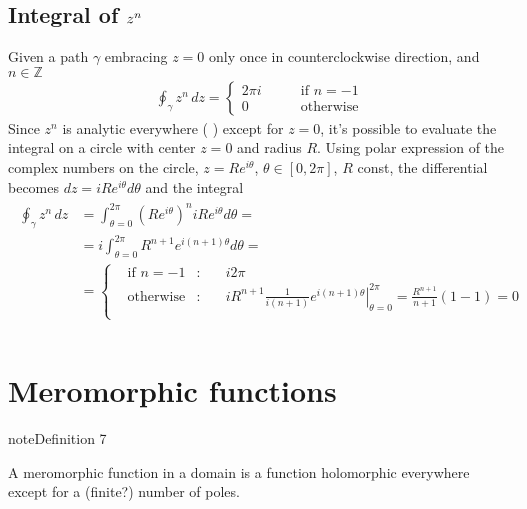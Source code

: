 \documentclass[letterpaper,10pt,english]{jupyterBook}
\begin{document}
\subsection{Integral of \protect\(z^n\protect\)}
\label{\detokenize{ch/complex/analysis:integral-of-z-n}}\label{\detokenize{ch/complex/analysis:complex-analysis-useful-int-path-independence-z-n}}
\sphinxAtStartPar
Given a path \(\gamma\) embracing \(z=0\) only once in counter\sphinxhyphen{}clockwise direction, and \(n \in \mathbb{Z}\)
\begin{equation*}
\begin{split}\oint_{\gamma} z^n \, dz = \left\{ \begin{aligned}  2 \pi i & \qquad \text{if $n = -1$} \\ 0 & \qquad \text{otherwise} \end{aligned} \right.\end{split}
\end{equation*}
\sphinxAtStartPar
Since \(z^n\) is analytic everywhere ( ) except for \(z=0\), it’s possible to evaluate the integral on a circle with center \(z=0\) and radius \(R\). Using polar expression of the complex numbers on the circle, \(z = R e^{i \theta}\), \(\theta \in [0, 2 \pi]\), \(R\) const, the differential becomes \(dz = i R e^{i \theta} d \theta\) and the integral
\begin{equation*}
\begin{split}\begin{aligned}
\oint_{\gamma} z^n \, dz
  & = \int_{\theta=0}^{2 \pi} \left( R e^{i\theta}\right)^n i R e^{i \theta} d \theta = \\
  & = i \int_{\theta=0}^{2 \pi} R^{n+1} e^{i (n+1) \theta} d \theta = \\
  & = \left\{ \begin{aligned}
    & \text{if $n=-1$} & : & \quad  i 2 \pi \\
    & \text{otherwise} & : & \quad  i R^{n+1} \frac{1}{i(n+1)} \left.e^{i(n+1)\theta}\right|_{\theta=0}^{2\pi} = \frac{R^{n+1}}{n+1} ( 1 - 1 ) = 0 \\
  \end{aligned} \right.\\
\end{aligned}\end{split}
\end{equation*}

\section{Meromorphic functions}
\label{\detokenize{ch/complex/analysis:meromorphic-functions}}\label{\detokenize{ch/complex/analysis:complex-analysis-mero-fun}}\label{ch/complex/analysis:definition-1}
\begin{sphinxadmonition}{note}{Definition 7}



\sphinxAtStartPar
A meromorphic function in a domain is a function holomorphic everywhere except for a (finite?) number of poles. 
\end{sphinxadmonition}
\end{document}
